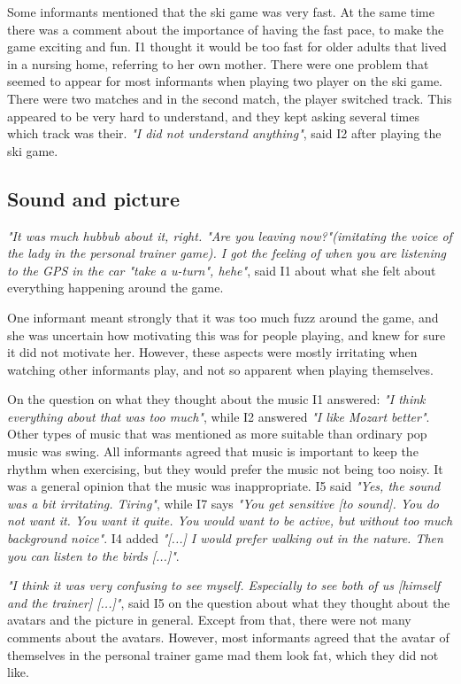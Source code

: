 Some informants mentioned that the ski game was very fast. At the same time there was a comment about the importance of having the fast pace, to make the game exciting and fun. I1 thought it would be too fast for older adults that lived in a nursing home, referring to her own mother. There were one problem that seemed to appear for most informants when playing two player on the ski game. There were two matches and in the second match, the player switched track. This appeared to be very hard to understand, and they kept asking several times which track was their. \emph{"I did not understand anything"}, said I2 after playing the ski game. 

\subsection{Sound and picture}
\emph{"It was much hubbub about it, right. "Are you leaving now?"(imitating the voice of the lady in the personal trainer game). I got the feeling of when you are listening to the GPS in the car "take a u-turn", hehe"}, said I1 about what she felt about everything happening around the game.

One informant meant strongly that it was too much fuzz around the game, and she was uncertain how motivating this was for people playing, and knew for sure it did not motivate her. However, these aspects were mostly irritating when watching other informants play, and not so apparent when playing themselves. 

On the question on what they thought about the music I1 answered: \emph{"I think everything about that was too much"}, while I2 answered \emph{"I like Mozart better"}. Other types of music that was mentioned as more suitable than ordinary pop music was swing. All informants agreed that music is important to keep the rhythm when exercising, but they would prefer the music not being too noisy. It was a general opinion that the music was inappropriate.  I5 said \emph{"Yes, the sound was a bit irritating. Tiring"}, while I7 says \emph{"You get sensitive [to sound]. You do not want it. You want it quite. You would want to be active, but without too much background noice"}. I4 added \emph{"[...] I would prefer walking out in the nature. Then you can listen to the birds [...]"}.

\emph{"I think it was very confusing to see myself. Especially to see both of us [himself and the trainer] [...]"}, said I5 on the question about what they thought about the avatars and the picture in general. Except from that, there were not many comments about the avatars. However, most informants agreed that the avatar of themselves in the personal trainer game mad them look fat, which they did not like. 

